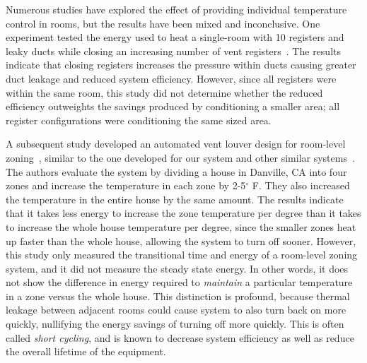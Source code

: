 Numerous studies have explored the effect of providing individual temperature
control in rooms, but the results have been mixed and inconclusive.  One
experiment tested the energy used to heat a single-room with 10 registers and
leaky ducts while closing an increasing number of vent
registers~\cite{walker2003register}.  The results indicate that closing
registers increases the pressure within ducts causing greater duct leakage and
reduced system efficiency.  However, since all registers were within the same
room, this study did not determine whether the reduced efficiency outweights the
savings produced by conditioning a smaller area; all register configurations
were conditioning the same sized area.

A subsequent study developed an automated vent louver design for room-level
zoning~\cite{watts2007application}, similar to the one developed for our system
and other similar systems~\cite{redfern2006design}.  The authors evaluate the
system by dividing a house in Danville, CA into four zones and increase the
temperature in each zone by 2-5$^\circ$ F. They also increased the temperature
in the entire house by the same amount.  The results indicate that it takes less
energy to increase the zone temperature per degree than it takes to increase the
whole house temperature per degree, since the smaller zones heat up faster than
the whole house, allowing the system to turn off sooner.  However, this study
only measured the transitional time and energy of a room-level zoning system,
and it did not measure the steady state energy.  In other words, it does not
show the difference in energy required to {\em maintain} a particular
temperature in a zone versus the whole house.  This distinction is profound,
because thermal leakage between adjacent rooms could cause system to also turn
back on more quickly, nullifying the energy savings of turning off more quickly.
This is often called {\em short cycling}, and is known to decrease system
efficiency as well as reduce the overall lifetime of the equipment.

